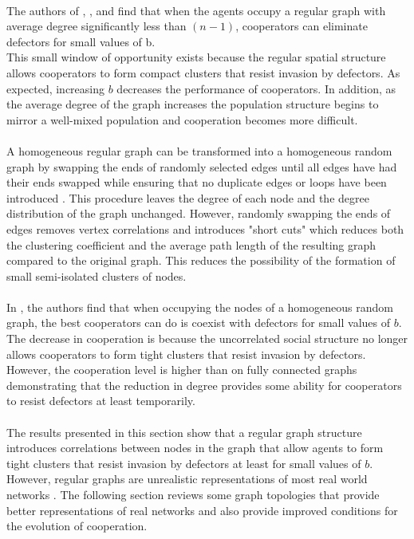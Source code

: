 \documentclass{article}
\begin{document}
    \paragraph{}The authors of \cite{Pacheco2005}, \cite{Santos2006a}, \cite{Santos2006c} and \cite{Santos2005b} find that when the agents occupy a regular graph with average degree significantly less than $(n-1)$, cooperators can eliminate defectors for small values of b.
    \\%
	\newpage
    This small window of opportunity exists because the regular spatial structure allows cooperators to form compact clusters that resist invasion by defectors.  As expected, increasing $b$ decreases the performance of cooperators.  In addition, as the average degree of the graph increases the population structure begins to mirror a well-mixed population and cooperation becomes more difficult.
    \paragraph{}A homogeneous regular graph can be transformed into a homogeneous random graph by swapping the ends of randomly selected edges until all edges have had their ends swapped while ensuring that no duplicate edges or loops have been introduced \cite{Maslov2002}.  This procedure leaves the degree of each node and the degree distribution of the graph unchanged. However, randomly swapping the ends of edges removes vertex correlations and introduces "short cuts" which reduces both the clustering coefficient and the average path length of the resulting graph compared to the original graph.  This reduces the possibility of the formation of small semi-isolated clusters of nodes.
    \paragraph{}In \cite{Santos2006c}, the authors find that when occupying the nodes of a homogeneous random graph, the best cooperators can do is coexist with defectors for small values of $b$.  The decrease in cooperation is because the uncorrelated social structure no longer allows cooperators to form tight clusters that resist invasion by defectors.  However, the cooperation level is higher than on fully connected graphs demonstrating that the reduction in degree provides some ability for cooperators to resist defectors at least temporarily.
    \paragraph{} The results presented in this section show that a regular graph structure introduces correlations between nodes in the graph that allow agents to form tight clusters that resist invasion by defectors at least for small values of $b$.  However, regular graphs are unrealistic representations of most real world networks \cite{Pacheco2005}.  The following section reviews some graph topologies that provide better representations of real networks and also provide improved conditions for the evolution of cooperation.
\end{document}
